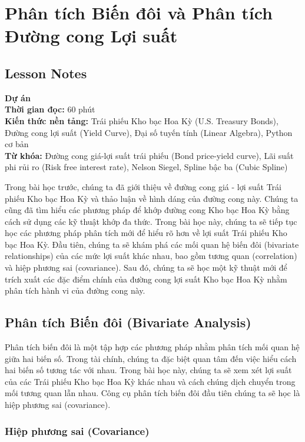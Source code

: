 \chapter{Phân tích Biến đôi và Phân tích Đường cong Lợi suất}
\label{ch:M1L4}

\section*{Lesson Notes}

\textbf{Dự án} \\
\textbf{Thời gian đọc:} 60 phút \\
\textbf{Kiến thức nền tảng:} Trái phiếu Kho bạc Hoa Kỳ (U.S. Treasury Bonds), Đường cong lợi suất (Yield Curve), Đại số tuyến tính (Linear Algebra), Python cơ bản \\
\textbf{Từ khóa:} Đường cong giá-lợi suất trái phiếu (Bond price-yield curve), Lãi suất phi rủi ro (Risk free interest rate), Nelson Siegel, Spline bậc ba (Cubic Spline)

Trong bài học trước, chúng ta đã giới thiệu về đường cong giá - lợi suất Trái phiếu Kho bạc Hoa Kỳ và thảo luận về hình dáng của đường cong này. Chúng ta cũng đã tìm hiểu các phương pháp để khớp đường cong Kho bạc Hoa Kỳ bằng cách sử dụng các kỹ thuật khớp đa thức. Trong bài học này, chúng ta sẽ tiếp tục học các phương pháp phân tích mới để hiểu rõ hơn về lợi suất Trái phiếu Kho bạc Hoa Kỳ. Đầu tiên, chúng ta sẽ khám phá các mối quan hệ biến đôi (bivariate relationships) của các mức lợi suất khác nhau, bao gồm tương quan (correlation) và hiệp phương sai (covariance). Sau đó, chúng ta sẽ học một kỹ thuật mới để trích xuất các đặc điểm chính của đường cong lợi suất Kho bạc Hoa Kỳ nhằm phân tích hành vi của đường cong này.

\section[Phân tích Biến đôi]{Phân tích Biến đôi (Bivariate Analysis)}

Phân tích biến đôi là một tập hợp các phương pháp nhằm phân tích mối quan hệ giữa hai biến số. Trong tài chính, chúng ta đặc biệt quan tâm đến việc hiểu cách hai biến số tương tác với nhau. Trong bài học này, chúng ta sẽ xem xét lợi suất của các Trái phiếu Kho bạc Hoa Kỳ khác nhau và cách chúng dịch chuyển trong mối tương quan lẫn nhau. Công cụ phân tích biến đôi đầu tiên chúng ta sẽ học là hiệp phương sai (covariance).

\subsection[Hiệp phương sai]{Hiệp phương sai (Covariance)}

